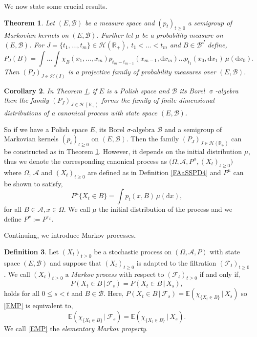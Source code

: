 \documentclass[a4paper, 12pt]{report}
\newtheorem{theorem}{Theorem}[section]
\newtheorem{corollary}[theorem]{Corollary}
\theoremstyle{remark}
\theoremstyle{definition}
\newtheorem{definition}[theorem]{Definition}
\begin{document}
We now state some crucial results.

\begin{theorem}\label{FAaSSPT3}
Let $(E, \mathcal{B})$ be a measure space and $(p_t)_{t \ge 0}$ a semigroup of Markovian kernels on $(E, \mathcal{B})$.  Further let $\mu$ be a probability measure on $(E, \mathcal{B})$.  For $J = \{t_1, \dots, t_m\} \in \mathcal{H}(\mathbb{R}_+)$, $t_1 < \dots < t_m$ and $B \in \mathcal{B}^J$ define,
$$
P_J(B) = \int\dots\int\chi_B(x_1, \dots, x_m)p_{t_m - t_{m - 1}}(x_{m - 1}, \mathrm{d}x_m)\dots p_{t_1}(x_0, \mathrm{d}x_1)\,\mu(\mathrm{d}x_0).
$$
Then $(P_J)_{J \in \mathcal{H}(I)}$ is a projective family of probability measures over $(E, \mathcal{B})$.
\end{theorem}

\begin{corollary}
In Theorem \ref{FAaSSPT3}, if $E$ is a Polish space and $\mathcal{B}$ its Borel $\upsigma$-algebra then the family $(P_J)_{J \in \mathcal{H}(\mathbb{R}_+)}$ forms the family of finite dimensional distributions of a canonical process with state space $(E, \mathcal{B})$.
\end{corollary}
So if we have a Polish space $E$, its Borel $\sigma$-algebra $\mathcal{B}$ and a semigroup of Markovian kernels $(p_t)_{t \ge 0}$ on $(E, \mathcal{B})$.  Then the family $(P_J)_{J \in \mathcal{H}(\mathbb{R}_+)}$ can be constructed as in Theorem \ref{FAaSSPT3}.  However, it depends on the initial distribution $\mu$, thus we denote the corresponding canonical process as $\big(\Omega, \mathcal{A}, P^\mu, (X_t)_{t \ge 0}\big)$ where $\Omega$, $\mathcal{A}$ and $(X_t)_{t \ge 0}$ are defined as in Definition \ref{FAaSSPD4} and $P^\mu$ can be shown to satisfy,
$$
P^\mu\{X_t \in B\} = \int p_t(x, B)\,\mu(\mathrm{d}x),
$$
for all $B \in \mathcal{A}, x \in \Omega$.  We call $\mu$ the initial distribution of the process and we define $P^x := P^{\varepsilon_x}$.

Continuing, we introduce Markov processes.

\begin{definition}
Let $(X_t)_{t \ge 0}$ be a stochastic process on $(\Omega, \mathcal{A}, P)$ with state space $(E, \mathcal{B})$ and suppose that $(X_t)_{t \ge 0}$ is adapted to the filtration $(\mathcal{F}_t)_{t \ge 0}$.  We call $(X_t)_{t \ge 0}$ a \emph{Markov process} with respect to $(\mathcal{F}_t)_{t \ge 0}$ if and only if,
\begin{equation}\label{EMP}
P(X_t \in B\,|\,\mathcal{F}_s) = P(X_t \in B\,|\, X_s),
\end{equation}
holds for all $0 \le s < t$ and $B \in \mathcal{B}$.  Here, $P(X_t \in B\,|\, \mathcal{F}_s) = \mathbb{E}(\chi_{\{X_t \in B\}}\,|\, X_s)$ so \eqref{EMP} is equivalent to,
$$
\mathbb{E}(\chi_{\{X_t \in B\}}\,|\, \mathcal{F}_s) = \mathbb{E}(\chi_{\{X_t \in B\}}\,|\, X_s).
$$
We call \eqref{EMP} the \emph{elementary Markov property}.
\end{definition}
\end{document}
